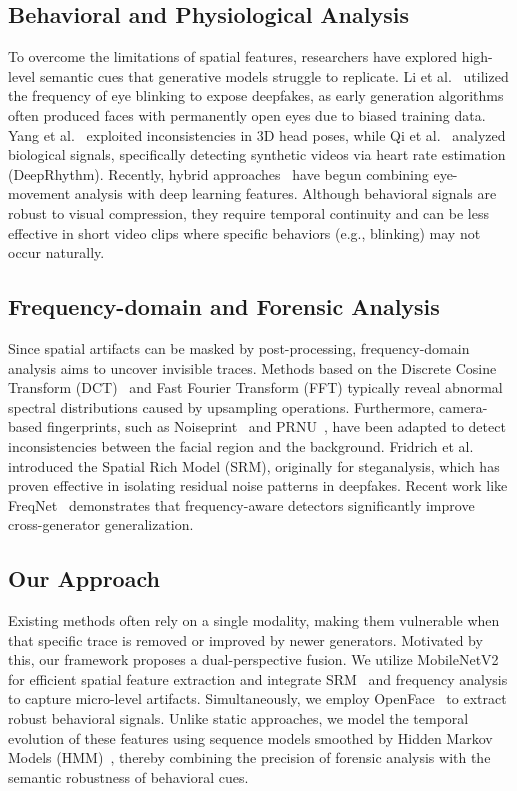\documentclass[conference]{IEEEtran}
\begin{document}
\subsection{Behavioral and Physiological Analysis}
To overcome the limitations of spatial features, researchers have explored high-level semantic cues that generative models struggle to replicate. Li et al.~\cite{b10} utilized the frequency of eye blinking to expose deepfakes, as early generation algorithms often produced faces with permanently open eyes due to biased training data. Yang et al.~\cite{b11} exploited inconsistencies in 3D head poses, while Qi et al.~\cite{b3} analyzed biological signals, specifically detecting synthetic videos via heart rate estimation (DeepRhythm). Recently, hybrid approaches~\cite{b6} have begun combining eye-movement analysis with deep learning features. Although behavioral signals are robust to visual compression, they require temporal continuity and can be less effective in short video clips where specific behaviors (e.g., blinking) may not occur naturally.

\subsection{Frequency-domain and Forensic Analysis}
Since spatial artifacts can be masked by post-processing, frequency-domain analysis aims to uncover invisible traces. Methods based on the Discrete Cosine Transform (DCT)~\cite{b9} and Fast Fourier Transform (FFT) typically reveal abnormal spectral distributions caused by upsampling operations. Furthermore, camera-based fingerprints, such as Noiseprint~\cite{b4} and PRNU~\cite{b7}, have been adapted to detect inconsistencies between the facial region and the background. Fridrich et al.~\cite{b19} introduced the Spatial Rich Model (SRM), originally for steganalysis, which has proven effective in isolating residual noise patterns in deepfakes. Recent work like FreqNet~\cite{b5} demonstrates that frequency-aware detectors significantly improve cross-generator generalization.

\subsection{Our Approach}
Existing methods often rely on a single modality, making them vulnerable when that specific trace is removed or improved by newer generators. Motivated by this, our framework proposes a dual-perspective fusion. We utilize MobileNetV2~\cite{b17} for efficient spatial feature extraction and integrate SRM~\cite{b19} and frequency analysis to capture micro-level artifacts. Simultaneously, we employ OpenFace~\cite{b18} to extract robust behavioral signals. Unlike static approaches, we model the temporal evolution of these features using sequence models smoothed by Hidden Markov Models (HMM)~\cite{b20}, thereby combining the precision of forensic analysis with the semantic robustness of behavioral cues.
\end{document}
